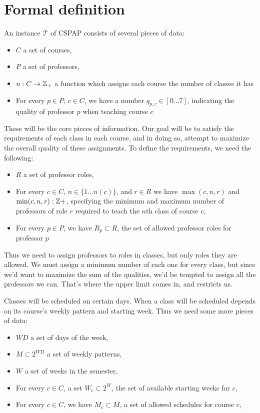 \section{Formal definition}
An instance $\mathcal{T}$ of CSPAP consists of several pieces of data:

\begin{itemize}
\item $C$ a set of courses,
\item $P$ a set of professors,
\item $n: C \to \mathbb{Z}_+$ a function which assigns each course the number of classes it has
\item For every $p \in P$, $c \in C$, we have a number $q_{p, c} \in [0 \dots 7]$, indicating the quality of professor $p$ when teaching course $c$
\end{itemize}

These will be the core pieces of information. Our goal will be to satisfy the requirements of each class in each course, and in doing so, attempt to maximize the overall quality of these assignments. To define the requirements, we need the following:
\begin{itemize}
\item $R$ a set of professor roles,
\item For every $c \in C$, $n \in \{1 \dots n(c)\}$, and $r \in R$ we have $\max(c, n, r)$ and $\min(c, n, r): \mathbb{Z}+$, specifying the minimum and maximum number of professors of role $r$ required to teach the $n$th class of course $c$,
\item For every $p \in P$, we have $R_p \subset R$, the set of allowed professor roles for professor $p$
\end{itemize}

Thus we need to assign professors to roles in classes, but only roles they are allowed. We must assign a minimum number of each one for every class, but since we'd want to maximize the sum of the qualities, we'd be tempted to assign all the professors we can. That's where the upper limit comes in, and restricts us.

Classes will be scheduled on certain days. When a class will be scheduled depends on its course's weekly pattern and starting week. Thus we need some more pieces of data:
\begin{itemize}
\item $WD$ a set of days of the week,
\item $M \subset 2^{WD}$ a set of weekly patterns,
\item $W$ a set of weeks in the semester,
\item For every $c \in C$, a set $W_c \subset 2^W$, the set of available starting weeks for $c$,
\item For every $c \in C$, we have $M_c \subset M$, a set of allowed schedules for course $c$,
\end{itemize}

